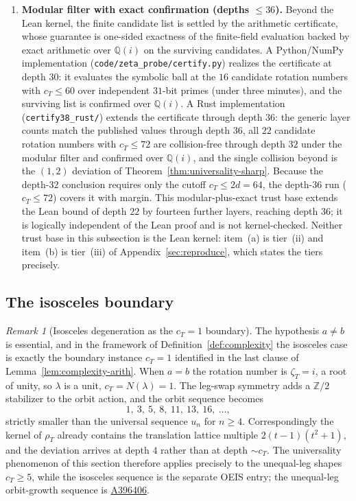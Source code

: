 \documentclass[11pt]{article}
\theoremstyle{plain}
\theoremstyle{definition}
\theoremstyle{remark}
\newtheorem{remark}[theorem]{Remark}
\begin{document}
\begin{enumerate}[label=\textup{(\alph*)},itemsep=0.3em]
\item \textbf{Modular filter with exact confirmation (depths
$\le 36$).} Beyond the Lean kernel, the finite candidate list is settled
by the arithmetic certificate, whose guarantee is one-sided exactness
of the finite-field evaluation backed by exact arithmetic over
$\mathbb{Q}(i)$ on the surviving candidates. A Python/NumPy
implementation (\texttt{code/zeta\_probe/certify.py}) realizes the
certificate at depth $30$: it evaluates the symbolic ball at the $16$
candidate rotation numbers with $c_T \le 60$ over independent $31$-bit
primes (under three minutes), and the surviving list is confirmed over
$\mathbb{Q}(i)$. A Rust implementation (\texttt{certify38\_rust/})
extends the certificate through depth $36$: the generic layer counts
match the published values through depth $36$, all $22$ candidate
rotation numbers with $c_T \le 72$ are collision-free through depth
$32$ under the modular filter and confirmed over $\mathbb{Q}(i)$, and
the single collision beyond is the $(1,2)$ deviation of
Theorem~\ref{thm:universality-sharp}. Because the depth-$32$ conclusion
requires only the cutoff $c_T \le 2d = 64$, the depth-$36$ run
($c_T \le 72$) covers it with margin. This modular-plus-exact trust
base extends the Lean bound of depth $22$ by fourteen further layers, reaching
depth $36$; it is logically independent of the Lean proof and is not
kernel-checked. Neither trust base in this subsection is the Lean kernel:
item~(a) is tier~(ii) and item~(b) is tier~(iii) of
Appendix~\ref{sec:reproduce}, which states the tiers precisely.
\end{enumerate}

\subsection{The isosceles boundary}

\begin{remark}[Isosceles degeneration as the $c_T = 1$ boundary]
\label{rem:isosceles}
The hypothesis $a \ne b$ is essential, and in the framework of
Definition~\ref{def:complexity} the isosceles case is exactly the
boundary instance $c_T = 1$ identified in the last clause of
Lemma~\ref{lem:complexity-arith}. When $a = b$ the rotation number is
$\zeta_T = i$, a root of unity, so $\lambda$ is a unit, $c_T = N(\lambda)
= 1$. The leg-swap symmetry adds a $\mathbb{Z}/2$ stabilizer to the
orbit action, and the orbit sequence becomes
\[
1,\ 3,\ 5,\ 8,\ 11,\ 13,\ 16,\ \ldots,
\]
strictly smaller than the universal sequence $u_n$ for $n \ge 4$.
Correspondingly the kernel of $\rho_T$ already contains the translation
lattice multiple $2(t-1)(t^2+1)$, and the deviation arrives at depth
$4$ rather than at depth $\sim c_T$. The universality phenomenon of
this section therefore applies precisely to the unequal-leg shapes
$c_T \ge 5$, while the isosceles sequence is the separate OEIS entry;
the unequal-leg orbit-growth sequence is
\href{https://oeis.org/A396406}{A396406}.
\end{remark}
\end{document}
